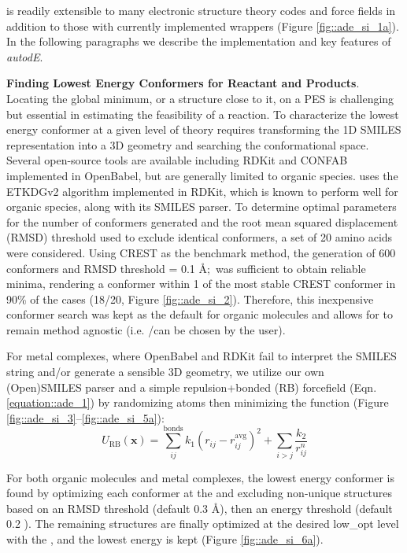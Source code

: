 \documentclass[../../main.tex]{subfiles}
\begin{document}
\ade is readily extensible to many electronic structure theory codes and force fields in addition to those with currently implemented wrappers (Figure \ref{fig::ade_si_1a}). In the following paragraphs we describe the implementation and key features of \emph{autodE}. 

{\bfseries{Finding Lowest Energy Conformers for Reactant and Products}}. Locating the global minimum, or a structure close to it, on a PES is challenging but essential in estimating the feasibility of a reaction.\cite{Chan2019} To characterize the lowest energy conformer at a given level of theory requires transforming the 1D SMILES representation into a 3D geometry and searching the conformational space. Several open-source tools are available including RDKit\cite{Landrum2019} and CONFAB\cite{OBoyle2011} implemented in OpenBabel, but are generally limited to organic species. \ade uses the ETKDGv2\cite{Riniker2015} algorithm implemented in RDKit, which is known to perform well for organic species, along with its SMILES parser.\cite{Ebejer2012} To determine optimal parameters for the number of conformers generated and the root mean squared displacement (RMSD) threshold used to exclude identical conformers, a set of 20 amino acids were considered. Using CREST\cite{Pracht2020} as the benchmark method, the generation of 600 conformers and RMSD threshold = 0.1 \AA$;$ was sufficient to obtain reliable minima, rendering a conformer within 1 \kcalx of the most stable CREST conformer in 90\% of the cases (18/20, Figure \ref{fig::ade_si_2}). Therefore, this inexpensive conformer search was kept as the default for organic molecules and allows for \ade to remain method agnostic (i.e. \lmethod/\hmethodx can be chosen by the user). 

For metal complexes, where OpenBabel and RDKit fail to interpret the SMILES string and/or generate a sensible 3D geometry, we utilize our own (Open)SMILES parser and a simple repulsion+bonded (RB) forcefield (Eqn. \eqref{equation::ade_1}) by randomizing atoms then minimizing the function (Figure \ref{fig::ade_si_3}--\ref{fig::ade_si_5a}):
\begin{equation}
	U_\text{RB}(\boldsymbol{x}) = \sum_{ij}^\text{bonds} k_1 (r_{ij} - r_{ij}^\text{avg})^2 + \sum_{i > j} \frac{k_2}{r_{ij}^n}
	\label{equation::ade_1}
\end{equation}

For both organic molecules and metal complexes, the lowest energy conformer is found by optimizing each conformer at the \lmethodx and excluding non-unique structures based on an RMSD threshold (default 0.3 \AA), then an energy threshold (default 0.2 \kcal). The remaining structures are finally optimized at the desired low\_opt level with the \hmethod, and the lowest energy is kept (Figure \ref{fig::ade_si_6a}).  
\end{document}
